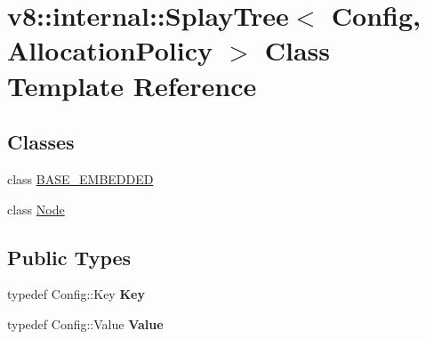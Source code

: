 \hypertarget{classv8_1_1internal_1_1_splay_tree}{}\section{v8\+:\+:internal\+:\+:Splay\+Tree$<$ Config, Allocation\+Policy $>$ Class Template Reference}
\label{classv8_1_1internal_1_1_splay_tree}
\subsection*{Classes}
\begin{DoxyCompactItemize}
\item 
class \hyperlink{classv8_1_1internal_1_1_splay_tree_1_1_b_a_s_e___e_m_b_e_d_d_e_d}{B\+A\+S\+E\+\_\+\+E\+M\+B\+E\+D\+D\+ED}
\item 
class \hyperlink{classv8_1_1internal_1_1_splay_tree_1_1_node}{Node}
\end{DoxyCompactItemize}
\subsection*{Public Types}
\begin{DoxyCompactItemize}
\item 
typedef Config\+::\+Key {\bfseries Key}\hypertarget{classv8_1_1internal_1_1_splay_tree_a37fb72d02bb9916a61b98b985bd376ba}{}\label{classv8_1_1internal_1_1_splay_tree_a37fb72d02bb9916a61b98b985bd376ba}

\item 
typedef Config\+::\+Value {\bfseries Value}\hypertarget{classv8_1_1internal_1_1_splay_tree_aa2d8e0e29b39457fa56226c8e18c41f7}{}\label{classv8_1_1internal_1_1_splay_tree_aa2d8e0e29b39457fa56226c8e18c41f7}

\end{DoxyCompactItemize}
